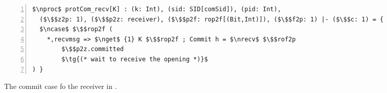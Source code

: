 \centering
\begin{lstlisting}[basicstyle=\scriptsize\BeraMonottFamily, frame=single, mathescape, numbers=left, xleftmargin=2em, xrightmargin=2em]
$\nproc$ protCom_recv[K] : (k: Int), (sid: SID[comSid]), (pid: Int), 
  ($\$$z2p: 1), ($\$$p2z: receiver), ($\$$p2f: rop2f[(Bit,Int)]), ($\$$f2p: 1) |- ($\$$c: 1) = {
  $\ncase$ $\$$rop2f (
    *,recvmsg => $\nget$ {1} K $\$$rop2f ; Commit h = $\nrecv$ $\$$rof2p
        $\$$p2z.committed 
        $\tg{(* wait to receive the opening *)}$
) }
\end{lstlisting}
\vspace{-0.5em}
\caption{The commit case fo the receiver in \protcom.}
\label{fig:protcomreceiver}
